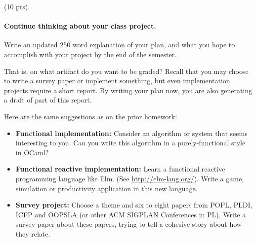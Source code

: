 \documentclass[11pt]{article}
\newcounter{taskcounter}
\newcounter{taskPercentCounter}
\newcommand{\task}[1]
  {\bigskip \noindent {\bf Task\addtocounter{taskPercentCounter}{#1} \arabic{taskcounter}\addtocounter{taskcounter}{1}} (#1 pts).}
\begin{document}
\begin{enumerate}
\task{10} \paragraph{Continue thinking about your class project.}
%
Write an updated 250 word explanation of your plan, and what you hope
to accomplish with your project by the end of the semester.

That is, on what artifact do you want to be graded?  Recall that you
may choose to write a survey paper or implement something, but even
implementation projects require a short report.  By writing your plan
now, you are also generating a draft of part of this report.

Here are the same suggestions as on the prior homework:
\begin{itemize}
\item \textbf{Functional implementation:}
  Consider an algorithm or system that seems interesting to you.
  Can you write this algorithm in a purely-functional style in OCaml?
\item \textbf{Functional reactive implementation:} Learn a functional
  reactive programming language like Elm. (See
  \url{http://elm-lang.org/}). Write a game, simulation or
  productivity application in this new language.
\item \textbf{Survey project:} Choose a theme and six to eight papers
  from POPL, PLDI, ICFP and OOPSLA (or other ACM SIGPLAN Conferences
  in PL).  Write a survey paper about these papers, trying to tell a
  cohesive story about how they relate.
\end{itemize}

\end{enumerate}
\end{document}
